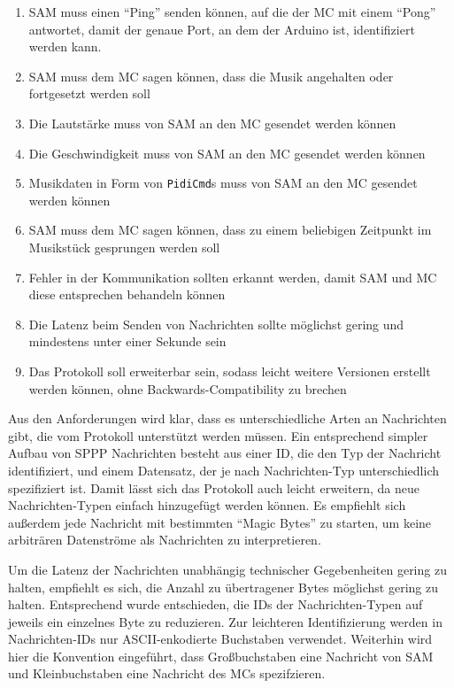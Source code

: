 \begin{enumerate}
    \item \ac{SAM} muss einen \enquote{Ping} senden können, auf die der \ac{MC} mit einem \enquote{Pong} antwortet, damit der genaue Port, an dem der Arduino ist, identifiziert werden kann.
    \item \ac{SAM} muss dem \ac{MC} sagen können, dass die Musik angehalten oder fortgesetzt werden soll
    \item Die Lautstärke muss von \ac{SAM} an den \ac{MC} gesendet werden können
    \item Die Geschwindigkeit muss von \ac{SAM} an den \ac{MC} gesendet werden können
    \item Musikdaten in Form von \lstinline|PidiCmd|s muss von \ac{SAM} an den \ac{MC} gesendet werden können
    \item \ac{SAM} muss dem \ac{MC} sagen können, dass zu einem beliebigen Zeitpunkt im Musikstück gesprungen werden soll
    \item Fehler in der Kommunikation sollten erkannt werden, damit \ac{SAM} und \ac{MC} diese entsprechen behandeln können
    \item Die Latenz beim Senden von Nachrichten sollte möglichst gering und mindestens unter einer Sekunde sein
    \item Das Protokoll soll erweiterbar sein, sodass leicht weitere Versionen erstellt werden können, ohne Backwards-Compatibility zu brechen
\end{enumerate}

Aus den Anforderungen wird klar, dass es unterschiedliche Arten an Nachrichten gibt, die vom Protokoll unterstützt werden müssen.
Ein entsprechend simpler Aufbau von \ac{SPPP} Nachrichten besteht aus einer ID, die den Typ der Nachricht identifiziert, und einem Datensatz, der je nach Nachrichten-Typ unterschiedlich spezifiziert ist.
Damit lässt sich das Protokoll auch leicht erweitern, da neue Nachrichten-Typen einfach hinzugefügt werden können.
Es empfiehlt sich außerdem jede Nachricht mit bestimmten \enquote{Magic Bytes} zu starten, um keine arbiträren Datenströme als Nachrichten zu interpretieren.

Um die Latenz der Nachrichten unabhängig technischer Gegebenheiten gering zu halten, empfiehlt es sich, die Anzahl zu übertragener Bytes möglichst gering zu halten.
Entsprechend wurde entschieden, die IDs der Nachrichten-Typen auf jeweils ein einzelnes Byte zu reduzieren.
Zur leichteren Identifizierung werden in Nachrichten-IDs nur ASCII-enkodierte Buchstaben verwendet.
Weiterhin wird hier die Konvention eingeführt, dass Großbuchstaben eine Nachricht von \ac{SAM} und Kleinbuchstaben eine Nachricht des \ac{MC}s spezifzieren.

